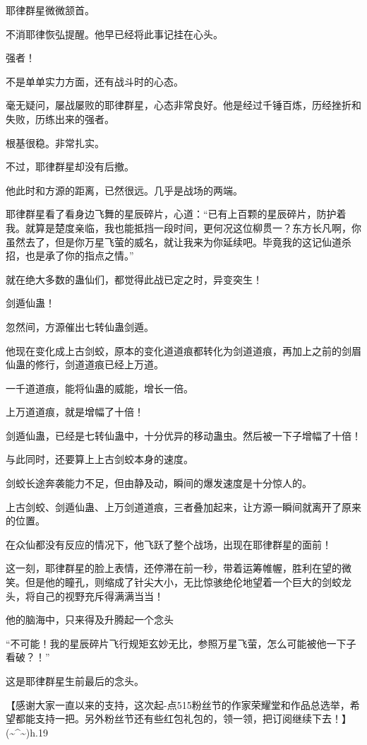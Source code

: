 \begin{this_body}
耶律群星微微颔首。

不消耶律恢弘提醒。他早已经将此事记挂在心头。

强者！

不是单单实力方面，还有战斗时的心态。

毫无疑问，屡战屡败的耶律群星，心态非常良好。他是经过千锤百炼，历经挫折和失败，历练出来的强者。

根基很稳。非常扎实。

不过，耶律群星却没有后撤。

他此时和方源的距离，已然很远。几乎是战场的两端。

耶律群星看了看身边飞舞的星辰碎片，心道：“已有上百颗的星辰碎片，防护着我。就算是楚度亲临，我也能抵挡一段时间，更何况这位柳贯一？东方长凡啊，你虽然去了，但是你万星飞萤的威名，就让我来为你延续吧。毕竟我的这记仙道杀招，也是承了你的指点之情。”

就在绝大多数的蛊仙们，都觉得此战已定之时，异变突生！

剑遁仙蛊！

忽然间，方源催出七转仙蛊剑遁。

他现在变化成上古剑蛟，原本的变化道道痕都转化为剑道道痕，再加上之前的剑眉仙蛊的修行，剑道道痕已经上万道。

一千道道痕，能将仙蛊的威能，增长一倍。

上万道道痕，就是增幅了十倍！

剑遁仙蛊，已经是七转仙蛊中，十分优异的移动蛊虫。然后被一下子增幅了十倍！

与此同时，还要算上上古剑蛟本身的速度。

剑蛟长途奔袭能力不足，但由静及动，瞬间的爆发速度是十分惊人的。

上古剑蛟、剑遁仙蛊、上万剑道道痕，三者叠加起来，让方源一瞬间就离开了原来的位置。

在众仙都没有反应的情况下，他飞跃了整个战场，出现在耶律群星的面前！

这一刻，耶律群星的脸上表情，还停滞在前一秒，带着运筹帷幄，胜利在望的微笑。但是他的瞳孔，则缩成了针尖大小，无比惊骇绝伦地望着一个巨大的剑蛟龙头，将自己的视野充斥得满满当当！

他的脑海中，只来得及升腾起一个念头

“不可能！我的星辰碎片飞行规矩玄妙无比，参照万星飞萤，怎么可能被他一下子看破？！”

这是耶律群星生前最后的念头。

【感谢大家一直以来的支持，这次起-点515粉丝节的作家荣耀堂和作品总选举，希望都能支持一把。另外粉丝节还有些红包礼包的，领一领，把订阅继续下去！】(\~{}\^{}\~{})h.19

\end{this_body}

